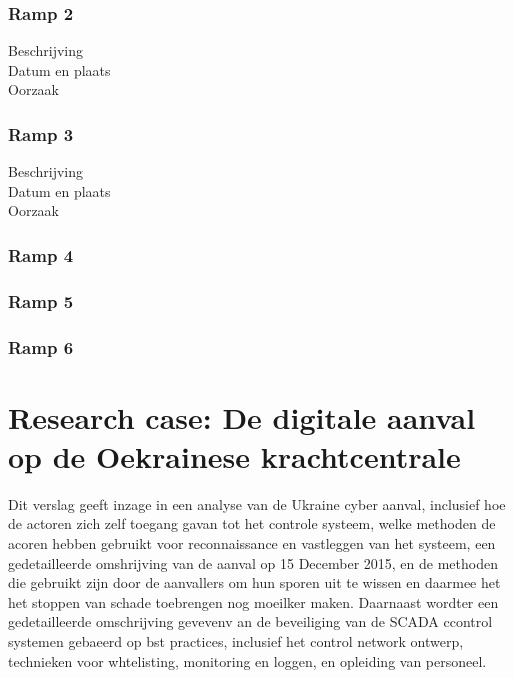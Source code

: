 \documentclass{article}
\begin{document}
	\subsubsection{Ramp 2}
	\begin{description}
		\item[Beschrijving]
		\item[Datum en plaats] 
		\item[Oorzaak]
	\end{description}
	
	\subsubsection{Ramp 3}
	\begin{description}
		\item[Beschrijving]
		\item[Datum en plaats] 
		\item[Oorzaak]
	\end{description}
	
	\subsubsection{Ramp 4}
	\subsubsection{Ramp 5}
	\subsubsection{Ramp 6}
	
	
	\section{Research case: De digitale aanval op de Oekrainese krachtcentrale}
	 Dit verslag geeft inzage in een analyse van de Ukraine cyber aanval,
	inclusief hoe de actoren zich zelf toegang gavan tot het controle systeem, welke methoden de acoren hebben gebruikt voor reconnaissance en vastleggen van het systeem, een gedetailleerde omshrijving van de aanval op 15 December 2015, en de methoden die gebruikt zijn door de aanvallers om hun sporen uit te wissen en daarmee het het stoppen van schade toebrengen  nog moeilker maken. Daarnaast wordter  een gedetailleerde omschrijving gevevenv an de beveiliging van de SCADA ccontrol systemen gebaeerd op bst practices, inclusief het control network ontwerp, technieken voor whtelisting, monitoring en loggen, en  opleiding van personeel.
	
\end{document}
